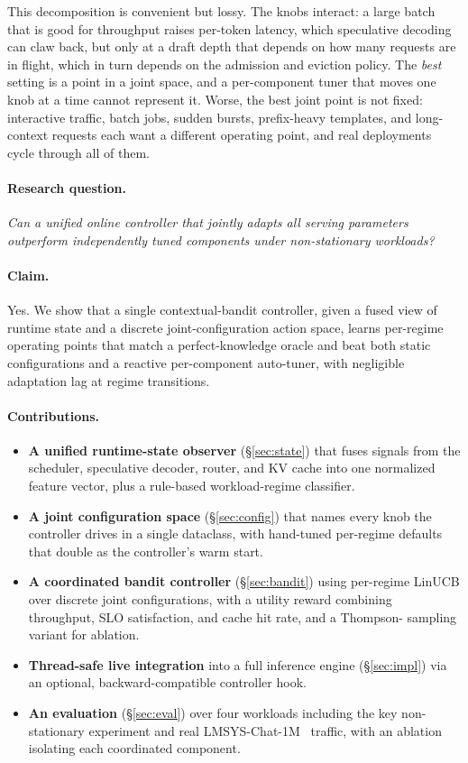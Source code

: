 \documentclass[10pt,twocolumn]{article}
\begin{document}
This decomposition is convenient but lossy. The knobs interact: a large batch
that is good for throughput raises per-token latency, which speculative decoding
can claw back, but only at a draft depth that depends on how many requests are
in flight, which in turn depends on the admission and eviction policy. The
\emph{best} setting is a point in a joint space, and a per-component tuner that
moves one knob at a time cannot represent it. Worse, the best joint point is not
fixed: interactive traffic, batch jobs, sudden bursts, prefix-heavy templates,
and long-context requests each want a different operating point, and real
deployments cycle through all of them.

\paragraph{Research question.} \emph{Can a unified online controller that jointly
adapts all serving parameters outperform independently tuned components under
non-stationary workloads?}

\paragraph{Claim.} Yes. We show that a single contextual-bandit controller,
given a fused view of runtime state and a discrete joint-configuration action
space, learns per-regime operating points that match a perfect-knowledge oracle
and beat both static configurations and a reactive per-component auto-tuner,
with negligible adaptation lag at regime transitions.

\paragraph{Contributions.}
\begin{itemize}
  \item \textbf{A unified runtime-state observer} (\S\ref{sec:state}) that fuses
  signals from the scheduler, speculative decoder, router, and KV cache into one
  normalized feature vector, plus a rule-based workload-regime classifier.
  \item \textbf{A joint configuration space} (\S\ref{sec:config}) that names every
  knob the controller drives in a single dataclass, with hand-tuned per-regime
  defaults that double as the controller's warm start.
  \item \textbf{A coordinated bandit controller} (\S\ref{sec:bandit}) using
  per-regime LinUCB over discrete joint configurations, with a utility reward
  combining throughput, SLO satisfaction, and cache hit rate, and a Thompson-
  sampling variant for ablation.
  \item \textbf{Thread-safe live integration} into a full inference engine
  (\S\ref{sec:impl}) via an optional, backward-compatible controller hook.
  \item \textbf{An evaluation} (\S\ref{sec:eval}) over four workloads including
  the key non-stationary experiment and real LMSYS-Chat-1M~\cite{zheng2023lmsys}
  traffic, with an ablation isolating each coordinated component.
\end{itemize}
\end{document}
